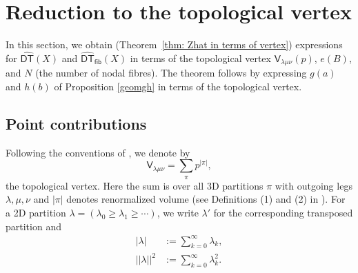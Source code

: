 \documentclass{amsart}
\theoremstyle{definition}
\newcommand{\sfV}{\mathsf{V}}
\newcommand{\DT}{\mathsf{DT}}
\newcommand{\DThat}{\widehat{\DT}}
\newcommand{\fiber}{\mathsf{fib}}
\begin{document}
\section{Reduction to the topological vertex}  \label{vertex} 

In this section, we obtain (Theorem~\ref{thm: Zhat in terms of
vertex}) expressions for $\DThat (X)$ and $\DThat_{\fiber }(X)$ in
terms of the topological vertex $\sfV_{\lambda\mu\nu}(p)$, $e(B)$, and
$N$ (the number of nodal fibres). The theorem follows by expressing
$g(a)$ and $h(b)$ of Proposition \ref{geomgh} in terms of the
topological vertex.


\subsection{Point contributions}   

Following the conventions of \cite{Bryan-Kool-Young}, we denote by 
$$
\sfV_{\lambda\mu\nu} = \sum_{\pi} p^{|\pi|}, 
$$
the topological vertex. Here the sum is over all 3D partitions $\pi$
with outgoing legs $\lambda, \mu, \nu$ and $|\pi|$ denotes
renormalized volume (see Definitions (1) and (2) in \cite{Bryan-Kool-Young}). For a
2D partition $\lambda = (\lambda_0 \geq \lambda_1 \geq \cdots)$, we
write $\lambda'$ for the corresponding transposed partition and
\begin{align*}
|\lambda| &:= \sum_{k=0}^{\infty} \lambda_k, \\
|\!|\lambda|\!|^2 &:= \sum_{k=0}^{\infty} \lambda_{k}^{2}.
\end{align*}
\end{document}

